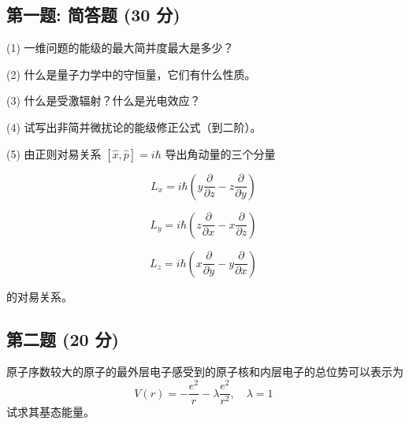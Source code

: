 

\subsection{第一题: 简答题 (30 分)}

(1) 一维问题的能级的最大简并度最大是多少？

(2) 什么是量子力学中的守恒量，它们有什么性质。

(3) 什么是受激辐射？什么是光电效应？

(4) 试写出非简并微扰论的能级修正公式（到二阶）。

(5) 由正则对易关系 $[\hat{x}, \hat{p}] = i\hbar$ 导出角动量的三个分量

\[L_x = i \hbar \left( y \frac{\partial}{\partial z} - z \frac{\partial}{\partial y} \right)~\]

\[L_y = i \hbar \left( z \frac{\partial}{\partial x} - x \frac{\partial}{\partial z} \right)~\]

\[L_z = i \hbar \left( x \frac{\partial}{\partial y} - y \frac{\partial}{\partial x} \right)~\]

的对易关系。
\subsection{第二题 (20 分)}
原子序数较大的原子的最外层电子感受到的原子核和内层电子的总位势可以表示为
\[V(r) = -\frac{e^2}{r} - \lambda \frac{e^2}{r^2}, \quad \lambda = 1~\]
试求其基态能量。